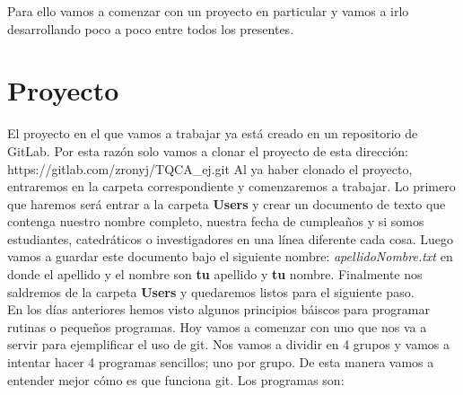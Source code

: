 \documentclass[10pt,letterpaper]{article}
\begin{document}
Para ello vamos a comenzar con un proyecto en particular y vamos a irlo desarrollando poco a poco entre todos los presentes.

\section{Proyecto}
El proyecto en el que vamos a trabajar ya est\'a creado en un repositorio de GitLab. Por esta raz\'on solo vamos a clonar el proyecto de esta direcci\'on: https://gitlab.com/zronyj/TQCA\_ej.git Al ya haber clonado el proyecto, entraremos en la carpeta correspondiente y comenzaremos a trabajar. Lo primero que haremos ser\'a entrar a la carpeta \textbf{Users} y crear un documento de texto que contenga nuestro nombre completo, nuestra fecha de cumplea\~nos y si somos estudiantes, catedr\'aticos o investigadores en una l\'inea diferente cada cosa. Luego vamos a guardar este documento bajo el siguiente nombre: \emph{apellidoNombre.txt} en donde el apellido y el nombre son \textbf{tu} apellido y \textbf{tu} nombre. Finalmente nos saldremos de la carpeta \textbf{Users} y quedaremos listos para el siguiente paso.\\

En los d\'ias anteriores hemos visto algunos principios b\'aiscos para programar rutinas o peque\~nos programas. Hoy vamos a comenzar con uno que nos va a servir para ejemplificar el uso de git. Nos vamos a dividir en 4 grupos y vamos a intentar hacer 4 programas sencillos; uno por grupo. De esta manera vamos a entender mejor c\'omo es que funciona git. Los programas son:
\end{document}

